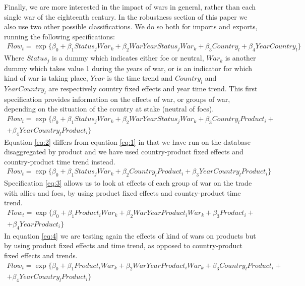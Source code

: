 \documentclass[12pt,a4paper,notitlepage,english]{article}
\begin{document}
Finally, we are more interested in the impact of wars in general, rather than each single war of the eighteenth century. 
In the robustness section of this paper we also use two other possible classifications. We do so both for imports and exports, running the following specifications: 
\begin{multline}\label{eq:1}
Flow_{t}=\exp\{\beta_0+\beta_1Status_jWar_k + \beta_2WarYearStatus_jWar_k+\beta_3Country_l +\beta_4YearCountry_l\}
\end{multline}
Where $Status_j$ is a dummy which indicates either foe or neutral, $War_k$ is another dummy which takes value 1 during the years of war, or is an indicator for which kind of war is taking place, $Year$ is the time trend and $Country_l$ and $YearCountry_l$ are respectively country fixed effects and year time trend. This first specification provides information on the effects of war, or groups of war, depending on the situation of the country at stake (neutral of foes). 
\begin{multline}\label{eq:2}
Flow_{t}=\exp\{\beta_0+\beta_1Status_jWar_k + \beta_2WarYearStatus_jWar_k+\beta_3Country_lProduct_i +\\ +\beta_4YearCountry_lProduct_i\}
\end{multline}
Equation \ref{eq:2} differs from equation \ref{eq:1} in that we have run on the database disaggregated by product and we have used country-product fixed effects and country-product time trend instead.  
\begin{multline}\label{eq:3}
Flow_{t}=\exp\{\beta_0+\beta_1Status_jWar_k + \beta_2Country_lProduct_i+\beta_3YearCountry_lProduct_i\}
\end{multline}
Specification \ref{eq:3} allows us to look at effects of each group of war on the trade with allies and foes, by using product fixed effects and country-product time trend.
\begin{multline}\label{eq:4}
Flow_{t}=\exp\{\beta_0+\beta_1Product_iWar_k + \beta_2WarYearProduct_iWar_k+\beta_3Product_i +\\ +\beta_4YearProduct_i\}
\end{multline}
In equation \ref{eq:4} we are testing again the effects of kind of wars on products but by using product fixed effects and time trend, as opposed to country-product fixed effects and trends. 
\begin{multline}\label{eq:5}
Flow_{t}=\exp\{\beta_0+\beta_1Product_iWar_k + \beta_2WarYearProduct_iWar_k+\beta_3Country_lProduct_i +\\ +\beta_4YearCountry_lProduct_i\}
\end{multline}
\end{document}
